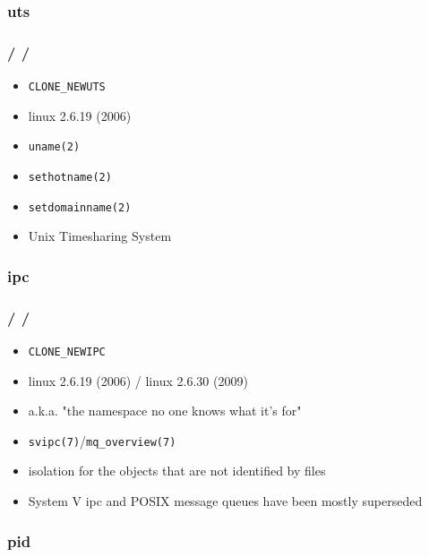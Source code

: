 \documentclass{beamer}
\newcommand{\autotitle}
{\frametitle{
    \secname
    \ifx\insertsubsection\empty
    \else
        /\subsecname
        \ifx\insertsubsubsection\empty\else/\subsubsecname\fi
    \fi}}
\begin{document}
\subsubsection{uts}

\begin{frame}
    \autotitle
    \begin{itemize}
        \item \texttt{CLONE\_NEWUTS}
        \item linux 2.6.19 (2006)
        \item \texttt{uname(2)}
        \item \texttt{sethotname(2)}
        \item \texttt{setdomainname(2)}
        \item Unix Timesharing System
    \end{itemize}
\end{frame}

\subsubsection{ipc}

\begin{frame}
    \autotitle
    \begin{itemize}
        \item \texttt{CLONE\_NEWIPC}
        \item linux 2.6.19 (2006) / linux 2.6.30 (2009)
        \item a.k.a. "the namespace no one knows what it's for"
        \item \texttt{svipc(7)}/\texttt{mq\_overview(7)}
        \item isolation for the objects that are not identified by files
        \item System V ipc and POSIX message queues have been mostly superseded
    \end{itemize}
\end{frame}

\subsubsection{pid}
\end{document}
